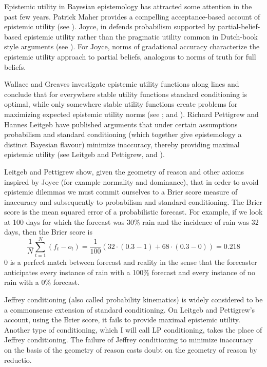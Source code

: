 \documentclass[11pt]{article}
\begin{document}
Epistemic utility in Bayesian epistemology has attracted some
attention in the past few years. Patrick Maher provides a compelling
acceptance-based account of epistemic utility (see
). Joyce, in  defends probabilism supported by
partial-belief-based epistemic utility rather than the pragmatic
utility common in Dutch-book style arguments (see
). For Joyce, norms of gradational accuracy
characterize the epistemic utility approach to partial beliefs,
analogous to norms of truth for full beliefs.

Wallace and Greaves investigate epistemic utility functions along
 lines and conclude that for everywhere stable
utility functions standard conditioning is optimal, while only
somewhere stable utility functions create problems for maximizing
expected epistemic utility norms (see ;
and ). Richard Pettigrew and Hannes Leitgeb
have published arguments that under certain assumptions probabilism
and standard conditioning (which together give epistemology a distinct
Bayesian flavour) minimize inaccuracy, thereby providing maximal
epistemic utility (see Leitgeb and Pettigrew,
 and
).

Leitgeb and Pettigrew show, given the geometry of reason and other
axioms inspired by Joyce (for example normality and dominance), that
in order to avoid epistemic dilemmas we must commit ourselves to a
Brier score measure of inaccuracy and subsequently to probabilism and
standard conditioning. The Brier score is the mean squared error of a
probabilistic forecast. For example, if we look at 100 days for which
the forecast was 30\% rain and the incidence of rain was 32 days, then
the Brier score is
\begin{equation}
  \label{eq:thahthoo}
  \frac{1}{N}\sum_{t=1}^{N}\left(f_{t}-o_{t}\right)=\frac{1}{100}\left(32\cdot{}(0.3-1)+68\cdot{}(0.3-0)\right)=0.218
\end{equation}
$0$ is a perfect match between forecast and reality in the sense that
the forecaster anticipates every instance of rain with a 100\%
forecast and every instance of no rain with a 0\% forecast.

Jeffrey conditioning (also called probability kinematics) is widely
considered to be a commonsense extension of standard conditioning. On
Leitgeb and Pettigrew's account, using the Brier score, it fails to
provide maximal epistemic utility. Another type of conditioning, which
I will call LP conditioning, takes the place of Jeffrey conditioning.
The failure of Jeffrey conditioning to minimize inaccuracy on the
basis of the geometry of reason casts doubt on the geometry of reason
by reductio.
\end{document}
